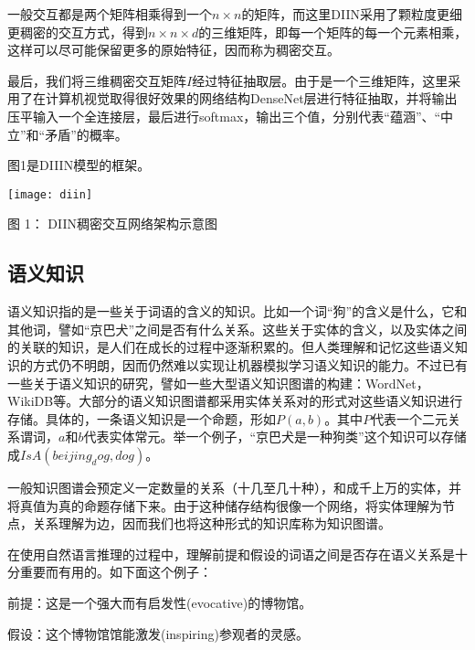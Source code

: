 \documentclass[UTF8,11pt,a4paper,nofonts]{ctexart}
\begin{document}
一般交互都是两个矩阵相乘得到一个$n\times n$的矩阵，而这里DIIN采用了颗粒度更细更稠密的交互方式，得到$n\times n \times d$的三维矩阵，即每一个矩阵的每一个元素相乘，这样可以尽可能保留更多的原始特征，因而称为稠密交互。

最后，我们将三维稠密交互矩阵$I$经过特征抽取层。由于是一个三维矩阵，这里采用了在计算机视觉取得很好效果的网络结构DenseNet层进行特征抽取，并将输出压平输入一个全连接层，最后进行softmax，输出三个值，分别代表“蕴涵”、“中立”和“矛盾”的概率。

图1是DIIIN模型的框架。

\begin{table}[htbp!]
\centering
\texttt{[image: diin]}
\caption*{图 1： DIIN稠密交互网络架构示意图}%
\end{table}

\subsection{语义知识}
语义知识指的是一些关于词语的含义的知识。比如一个词“狗”的含义是什么，它和其他词，譬如“京巴犬”之间是否有什么关系。这些关于实体的含义，以及实体之间的关联的知识，是人们在成长的过程中逐渐积累的。但人类理解和记忆这些语义知识的方式仍不明朗，因而仍然难以实现让机器模拟学习语义知识的能力。不过已有一些关于语义知识的研究，譬如一些大型语义知识图谱的构建：WordNet，WikiDB等。大部分的语义知识图谱都采用实体关系对的形式对这些语义知识进行存储。具体的，一条语义知识是一个命题，形如$P(a, b)$。其中$P$代表一个二元关系谓词，$a$和$b$代表实体常元。举一个例子，“京巴犬是一种狗类”这个知识可以存储成$IsA(beijing_dog, dog)$。

一般知识图谱会预定义一定数量的关系（十几至几十种），和成千上万的实体，并将真值为真的命题存储下来。由于这种储存结构很像一个网络，将实体理解为节点，关系理解为边，因而我们也将这种形式的知识库称为知识图谱。


在使用自然语言推理的过程中，理解前提和假设的词语之间是否存在语义关系是十分重要而有用的。如下面这个例子：
    

前提：这是一个强大而有启发性(evocative)的博物馆。

假设：这个博物馆馆能激发(inspiring)参观者的灵感。
\end{document}

